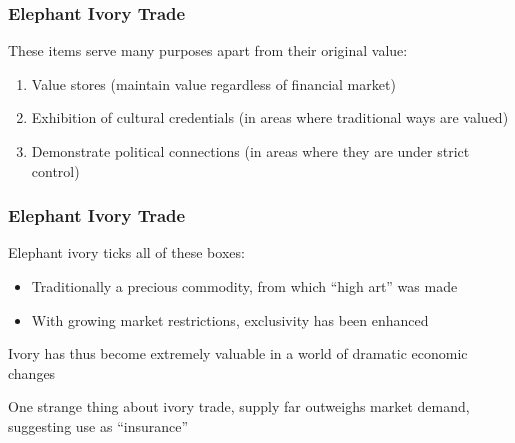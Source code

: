 \documentclass[10pt]{beamer}
\begin{document}
\begin{frame}[t]
\frametitle{Elephant Ivory Trade}
\vspace{0.5cm}

	These items serve many purposes apart from their original value:\\
		\medskip
		\begin{enumerate}
			\item Value stores (maintain value regardless of financial market)
			\medskip
			\item Exhibition of cultural credentials (in areas where traditional ways are valued)
			\medskip
			\item Demonstrate political connections (in areas where they are under strict control)
		\end{enumerate}
\end{frame}


\begin{frame}[t]
\frametitle{Elephant Ivory Trade}
\vspace{0.5cm}

	Elephant ivory ticks all of these boxes:\\
	\medskip
		\begin{itemize}
			\item Traditionally a precious commodity, from which ``high art'' was made
			\medskip
			\item With growing market restrictions, exclusivity has been enhanced\\
		\end{itemize}
	
	\vspace{0.5cm}
	
	Ivory has thus become extremely valuable in a world of dramatic economic changes\\
	
	\vspace{0.5cm}
	
	One strange thing about ivory trade, supply far outweighs market demand, suggesting use as ``insurance''
\end{frame}
\end{document}
